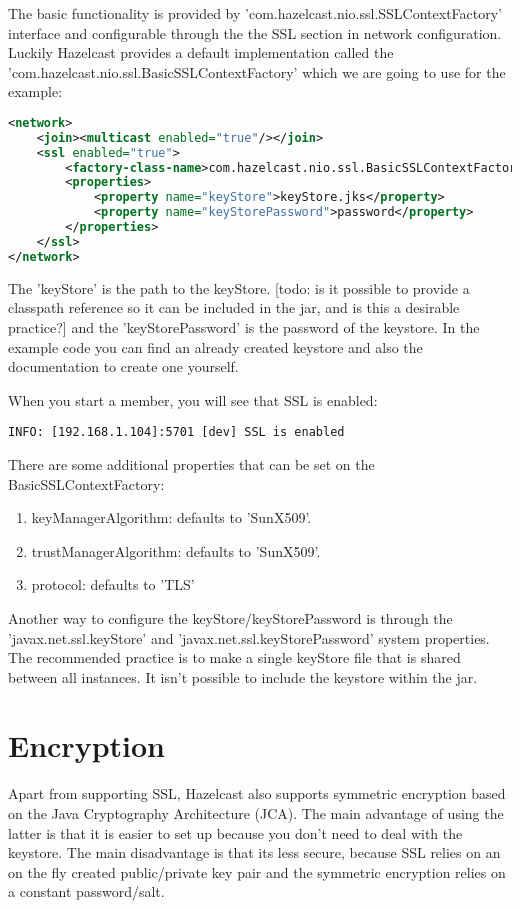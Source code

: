 The basic functionality is provided by 'com.hazelcast.nio.ssl.SSLContextFactory' interface and configurable through the the SSL section in network configuration. Luckily Hazelcast provides a default implementation called the 'com.hazelcast.nio.ssl.BasicSSLContextFactory' which we are going to use for the example:
\begin{lstlisting}[language=xml]
<network>
    <join><multicast enabled="true"/></join>
    <ssl enabled="true">
        <factory-class-name>com.hazelcast.nio.ssl.BasicSSLContextFactory</factory-class-name>
        <properties>
            <property name="keyStore">keyStore.jks</property>
            <property name="keyStorePassword">password</property>
        </properties>
    </ssl>
</network>
\end{lstlisting}
The 'keyStore' is the path to the keyStore. [todo: is it possible to provide a classpath reference so it can be included in the jar, and is this a desirable practice?] and the 'keyStorePassword' is the password of the keystore. In the example code you can find an already created keystore and also the documentation to create one yourself.

When you start a member, you will see that SSL is enabled:
\begin{lstlisting}
INFO: [192.168.1.104]:5701 [dev] SSL is enabled
\end{lstlisting}

There are some additional properties that can be set on the BasicSSLContextFactory:
\begin{enumerate}
\item keyManagerAlgorithm: defaults to 'SunX509'.
\item trustManagerAlgorithm: defaults to 'SunX509'.
\item protocol: defaults to 'TLS'
\end{enumerate}
Another way to configure the keyStore/keyStorePassword is through the 'javax.net.ssl.keyStore' and 'javax.net.ssl.keyStorePassword' system properties. The recommended practice is to make a single keyStore file that is shared between all instances. It isn't possible to include the keystore within the jar.

\section{Encryption}
Apart from supporting SSL, Hazelcast also supports symmetric encryption based on the Java Cryptography Architecture (JCA). The main advantage of using the latter is that it is easier to set up because you don't need to deal with the keystore. The main disadvantage is that its less secure, because SSL relies on an on the fly created public/private key pair and the symmetric encryption relies on a constant password/salt.

